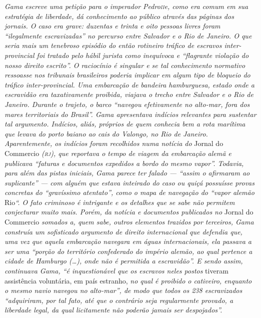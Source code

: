 \begin{didascalia}
\emph{Gama escreve uma petição para o imperador Pedro\textsc{ii}e, como era
comum em sua estratégia de liberdade, dá conhecimento ao público através
das páginas dos jornais. O caso era grave: duzentas e trinta e oito
pessoas livres foram ``ilegalmente escravizadas'' no percurso entre
Salvador e o Rio de Janeiro. O que seria mais um tenebroso episódio do
então rotineiro tráfico de escravos inter-provincial foi tratado pelo
hábil jurista como inequívoca e ``flagrante violação do nosso direito
escrito''. O raciocínio é singular e se tal conhecimento normativo
ressoasse nos tribunais brasileiros poderia implicar em algum tipo de
bloqueio do tráfico inter-provincial. Uma embarcação de bandeira
hamburguesa, estado onde a escravidão era taxativamente proibida,
viajava o trecho entre Salvador e o Rio de Janeiro. Durante o trajeto, o
barco ``navegou efetivamente no alto-mar, fora dos mares territoriais do
Brasil''. Gama apresentava indícios relevantes para sustentar tal
argumento. Indícios, aliás, próprios de quem conhecia bem a rota
marítima que levava do porto baiano ao cais do Valongo, no Rio de
Janeiro. Aparentemente, os indícios foram recolhidos numa notícia do}
Jornal do Commercio \emph{(\textsc{rj}), que reportava o tempo de viagem da
embarcação alemã e publicava ``faturas e documentos expedidos a bordo do
mesmo vapor''. Todavia, para além das pistas iniciais, Gama parece ter
falado --- ``assim o afirmaram ao suplicante'' --- com alguém que estava
inteirado do caso ou quiçá possuísse provas concretas do ``gravíssimo
atentato'', como o mapa de navegação do ``vapor alemão} Rio\emph{``. O fato
criminoso é intrigante e os detalhes que se sabe não permitem
conjecturar muito mais. Porém, da notícia e documentos publicados no}
Jornal do Commercio \emph{somados a, quem sabe, outros elementos
trazidos por terceiros, Gama construía um sofisticado argumento de
direito internacional que defendia que, uma vez que aquela embarcação
navegara em águas internacionais, ela passava a ser uma ``porção do
território confederado do império alemão, ao qual pertence a cidade de
Hamburgo (\ldots{}), onde não é permitida a escravidão''. E sendo assim,
continuava Gama, ``é inquestionável que os escravos neles postos} tiveram
assistência voluntária, em país estranho, \emph{no qual é proibido o
cativeiro, enquanto o mesmo navio navegou no alto-mar'', de modo que
todos os 238 escravizados ``adquiriram, por tal fato, até que o contrário
seja regularmente provado, a liberdade legal, da qual licitamente não
poderão jamais ser despojados''.}
\end{didascalia}

